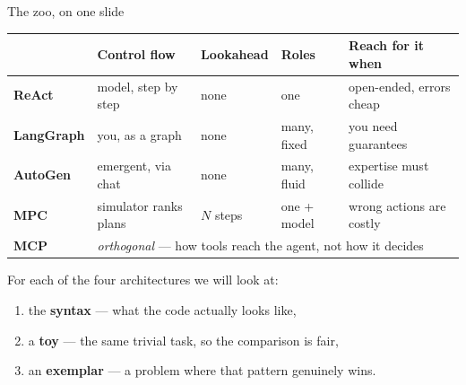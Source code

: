 \documentclass[aspectratio=169,10pt]{beamer}
\begin{document}
\begin{frame}{The zoo, on one slide}
\begin{center}\small
\begin{tabular}{@{}lllll@{}}
\toprule
 & \textbf{Control flow} & \textbf{Lookahead} & \textbf{Roles} & \textbf{Reach for it when} \\
\midrule
\textbf{ReAct}
  & model, step by step & none & one
  & open-ended, errors cheap \\[3pt]
\textbf{LangGraph}
  & you, as a graph & none & many, fixed
  & you need guarantees \\[3pt]
\textbf{AutoGen}
  & emergent, via chat & none & many, fluid
  & expertise must collide \\[3pt]
\textbf{MPC}
  & simulator ranks plans & $N$ steps & one + model
  & wrong actions are costly \\[3pt]
\midrule
\textbf{MCP}
  & \multicolumn{4}{l}{\emph{orthogonal} --- how tools reach the agent, not how it decides} \\
\bottomrule
\end{tabular}
\end{center}

\vspace{1em}
For each of the four architectures we will look at:
\begin{enumerate}\itemsep2pt
  \item the \textbf{syntax} --- what the code actually looks like,
  \item a \textbf{toy} --- the same trivial task, so the comparison is fair,
  \item an \textbf{exemplar} --- a problem where that pattern genuinely wins.
\end{enumerate}
\end{frame}
\end{document}
